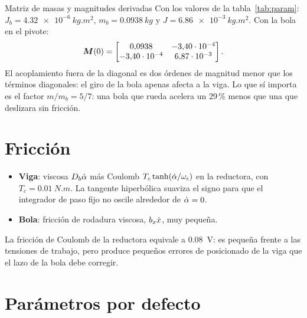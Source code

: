 \begin{ejemplo}{Matriz de masas y magnitudes derivadas}
Con los valores de la tabla~\ref{tab:param}: $J_b=\SI{4.32e-6}{kg.m^2}$, $m_b=\SI{0.0938}{kg}$ y $J=\SI{6.86e-3}{kg.m^2}$. Con la bola en el pivote:
\[
\bm{M}(0)=\begin{bmatrix}0{,}0938 & -3{,}40\cdot10^{-4}\\ -3{,}40\cdot10^{-4} & 6{,}87\cdot10^{-3}\end{bmatrix}.
\]
El acoplamiento fuera de la diagonal es dos órdenes de magnitud menor que los términos diagonales: el giro de la bola apenas afecta a la viga. Lo que sí importa es el factor $m/m_b=5/7$: una bola que rueda acelera un 29\,\% menos que una que deslizara sin fricción.
\end{ejemplo}

\section{Fricción}

\begin{itemize}
  \item \textbf{Viga}: viscosa $D_b\dot{\alpha}$ más Coulomb $T_c\tanh(\dot{\alpha}/\omega_\epsilon)$ en la reductora, con $T_c=\SI{0.01}{N.m}$. La tangente hiperbólica suaviza el signo para que el integrador de paso fijo no oscile alrededor de $\dot{\alpha}=0$.
  \item \textbf{Bola}: fricción de rodadura viscosa, $b_x\dot{x}$, muy pequeña.
\end{itemize}
La fricción de Coulomb de la reductora equivale a \SI{0.08}{V}: es pequeña frente a las tensiones de trabajo, pero produce pequeños errores de posicionado de la viga que el lazo de la bola debe corregir.

\section{Parámetros por defecto}

